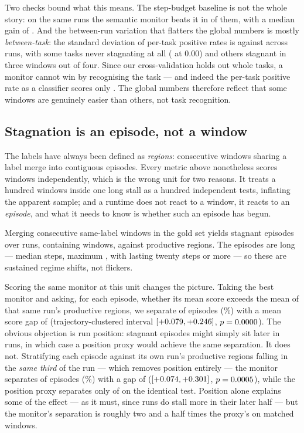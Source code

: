 Two checks bound what this means. The step-budget baseline is not the whole story: on the same runs the
semantic monitor beats it in \pwithinVsBudgetWins{} of them, with a median gain of
\pwithinVsBudgetMedian{}. And the between-run variation that flatters the global numbers is mostly
\emph{between-task}: the standard deviation of per-task positive rates is \pvarianceTaskSdStrict{} against
\pvarianceRunSdStrict{} across runs, with some tasks never stagnating at all
(\pvarianceZeroTasksStrict{} at $0.00$) and others stagnant in three windows out of four. Since our
cross-validation holds out whole tasks, a monitor cannot win by recognising the task --- and indeed the
per-task positive rate as a classifier scores only \pvarianceTaskAucStrict{}. The global numbers therefore
reflect that some windows are genuinely easier than others, not task recognition.

\subsection{Stagnation is an episode, not a window}
\label{sec:res-regimes}
The labels have always been defined as \emph{regions}: consecutive windows sharing a label merge into
contiguous episodes. Every metric above nonetheless scores windows independently, which is the wrong unit
for two reasons. It treats a hundred windows inside one long stall as a hundred independent tests,
inflating the apparent sample; and a runtime does not react to a window, it reacts to an \emph{episode},
and what it needs to know is whether such an episode has begun.

Merging consecutive same-label windows in the gold set yields \pregEpisodes{} stagnant episodes over
\pnAlarmTrajPos{} runs, containing \pregEpWindows{} windows, against \pregProdRegions{} productive
regions. The episodes are long --- median \pregMedianSteps{} steps, maximum \pregMaxSteps{}, with
\pregGeTwenty{} lasting twenty steps or more --- so these are sustained regime shifts, not flickers.

Scoring the same monitor at this unit changes the picture. Taking the best monitor and asking, for each
episode, whether its mean score exceeds the mean of that same run's productive regions, we separate
\pregSep{} of \pregTot{} episodes (\pregSepPct{}\%) with a mean score gap of \pregDiff{}
(trajectory-clustered interval $[+0.079{},+0.246{}]$, $p=0.0000{}$). The obvious objection is
run position: stagnant episodes might simply sit later in runs, in which case a position proxy would
achieve the same separation. It does not. Stratifying each episode against its own run's productive
regions falling in the \emph{same third} of the run --- which removes position entirely --- the monitor
separates \pregPmSep{} of \pregPmTot{} episodes (\pregPmPct{}\%) with a gap of \pregPmDiff{}
($[+0.074{},+0.301{}]$, $p=0.0005{}$), while the position proxy separates only \pregProxySep{} of
\pregProxyTot{} on the identical test. Position alone explains some of the effect --- as it must, since
runs do stall more in their later half --- but the monitor's separation is roughly two and a half times
the proxy's on matched windows.

